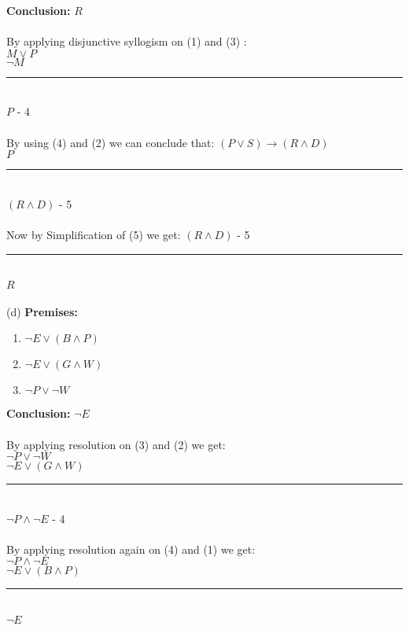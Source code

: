 \documentclass{article}
\begin{document}
\textbf{Conclusion:}
$ R $ \\
\\
By applying disjunctive syllogism on (1) and (3) : \\
$ M \vee P $ \\
$\neg M $ \\
\noindent\rule{1.9cm}{0.4pt}\\
$ P $ - 4 \\
\\
By using (4) and (2) we can conclude that:
$(P \vee S) \rightarrow (R \wedge D) $ \\
$ P $ \\
\noindent\rule{1.9cm}{0.4pt}\\
$ (R \wedge D) $ - 5 \\
\\
Now by Simplification of (5) we get:
$ (R \wedge D) $ - 5 \\
\noindent\rule{1.9cm}{0.4pt}\\
$ R $ \\
\\
(d) \textbf{Premises:}
 \begin{enumerate}
    \item $\neg E \vee (B \wedge P)$
    \item $ \neg E \vee (G \wedge W)$
    \item $\neg P \vee \neg W$ 
    \end{enumerate}
\textbf{Conclusion:}
$\neg E $ \\
\\
By applying resolution on (3) and (2) we get: \\
$\neg P \vee \neg W$ \\
$\neg E \vee (G \wedge W)$ \\
\noindent\rule{1.9cm}{0.4pt}\\
 $ \neg P \wedge \neg E $ - 4 \\
 \\
 By applying resolution again on (4) and (1) we get: \\
 $ \neg P \wedge \neg E $ \\
 $\neg E \vee (B \wedge P)$ \\
 \noindent\rule{1.9cm}{0.4pt}\\
 $\neg E $\\
\\
\end{document}
